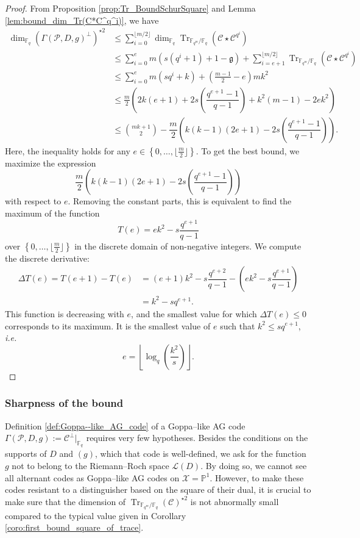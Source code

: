 \documentclass[a4paper]{article}
\theoremstyle{definition}
\theoremstyle{remark}
\newcommand{\calP}{\mathcal{P}}
\newcommand{\calL}{\mathcal{L}}
\newcommand{\calC}{\mathcal{C}}
\newcommand{\calX}{\mathcal{X}}
\newcommand{\fq}{\mathbb{F}_{q}}
\newcommand{\PP}{\mathbb{P}}
\newcommand{\Tr}[1]{\operatorname{Tr}_{\mathbb{F}_{q^m}/\fq}\left(#1\right)}
\newcommand{\set}[1]{\left\{#1\right\}}
\begin{document}
\begin{proof}
    From Proposition \ref{prop:Tr_BoundSchurSquare} and Lemma \ref{lem:bound_dim_Tr(C*C^q^i)}, we have 
    \begin{align*}
        \dim_{\fq}(\Gamma(\calP,D,g)^{\perp})^{\star 2}
        & \leq \sum\limits_{i=0}^{\lfloor m/2 \rfloor} \dim_{\fq} \Tr{\calC \star \calC^{q^i}} \\
        & \leq \sum\limits_{i=0}^{e} m(s(q^i+1)+1-\mathfrak{g})  + \sum\limits_{i=e+1}^{\lfloor m/2 \rfloor} \Tr{\calC \star \calC^{q^i}} \\
        & \leq \sum\limits_{i=0}^{e} m(sq^i+k) + \left( \frac{m-1}{2} -e \right)mk^2 \\
        & \leq \frac{m}{2}\left(2k(e+1)+2s\left(\dfrac{q^{e+1}-1}{q-1}\right)+k^2(m-1)-2ek^2  \right) \\
        & \leq \binom{mk+1}{2} -  \dfrac{m}{2}\left(k(k-1)(2e+1)-2s\left(\dfrac{q^{e+1}-1}{q-1}\right)\right).
    \end{align*}
Here, the inequality holds for any $e \in \set{0,\dots,\lfloor \frac{m}{2} \rfloor}$. To get the best bound, we maximize the expression $$ \dfrac{m}{2}\left(k(k-1)(2e+1)-2s\left(\dfrac{q^{e+1}-1}{q-1}\right)\right)$$ with respect to $e$. Removing the constant parts, this is equivalent to find the maximum of the function
$$T(e) = ek^2-s\dfrac{q^{e+1}}{q-1}$$
over $\set{0,\dots,\lfloor \frac{m}{2} \rfloor}$ in the discrete domain of non-negative integers.  
We compute the discrete derivative:
\begin{align*}
    \Delta T(e) = T(e+1)-T(e) &= (e+1)k^2-s\dfrac{q^{e+2}}{q-1} - \left(ek^2-s\dfrac{q^{e+1}}{q-1}\right) \\
                              &= k^2 - sq^{e+1}.
\end{align*}
This function is decreasing with $e$, and the smallest value for which $\Delta T(e) \leq 0$ corresponds to its maximum. It is the smallest value of $e$ such that $k^2 \leq sq^{e+1}$, \emph{i.e.}
$$e =  \left\lfloor \log_q\left(\dfrac{k^2}{s}\right)\right\rfloor.$$
\end{proof}

\subsubsection{Sharpness of the bound}

Definition \ref{def:Goppa--like_AG_code} of a Goppa--like AG code $\Gamma(\calP,D,g) := \calC^{\perp}|_{\fq}$ requires very few hypotheses. Besides the conditions on the supports of $D$ and $(g)$, which that code is well-defined, we ask for the function $g$ not to belong to the Riemann--Roch space $\calL(D)$. By doing so, we cannot see all alternant codes as Goppa--like AG codes on $\calX=\PP^1$. However, to make these codes resistant to a distinguisher based on the square of their dual, it is crucial to make sure that the dimension of $\Tr{\calC}^{\star 2}$ is not abnormally small compared to the typical value given in Corollary \ref{coro:first_bound_square_of_trace}.
\end{document}

